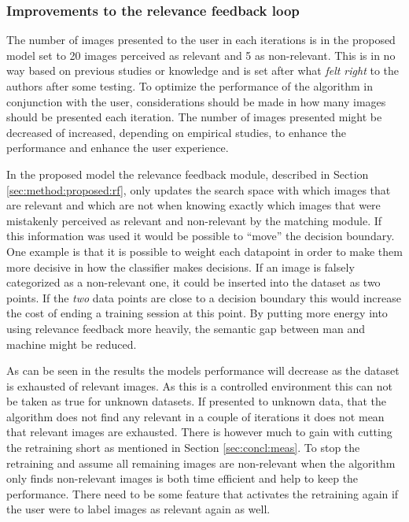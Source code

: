 \subsubsection{Improvements to the relevance feedback loop}
\label{sec:conc:future:model:rf}
The number of images presented to the user in each iterations is in the proposed model set to 20 images perceived as relevant and 5 as non-relevant. This is in no way based on previous studies or knowledge and is set after what \emph{felt right} to the authors after some testing. To optimize the performance of the algorithm in conjunction with the user, considerations should be made in how many images should be presented each iteration. The number of images presented might be decreased of increased, depending on empirical studies, to enhance the performance and enhance the user experience.

In the proposed model the relevance feedback module, described in Section \ref{sec:method:proposed:rf}, only updates the search space with which images that are relevant and which are not when knowing exactly which images that were mistakenly perceived as relevant and non-relevant by the matching module. If this information was used it would be possible to ``move'' the decision boundary. 
One example is that it is possible to weight each datapoint in order to make them more decisive in how the classifier makes decisions. If an image is falsely categorized as a non-relevant one, it could be inserted into the dataset as two points. If the \emph{two} data points are close to a decision boundary this would increase the cost of ending a training session at this point. By putting more energy into using relevance feedback more heavily, the semantic gap between man and machine might be reduced. 

As can be seen in the results the models performance will decrease as the dataset is exhausted of relevant images. As this is a controlled environment this can not be taken as true for unknown datasets. If presented to unknown data, that the algorithm does not find any relevant in a couple of iterations it does not mean that relevant images are exhausted. There is however much to gain with cutting the retraining short as mentioned in Section \ref{sec:concl:meas}. To stop the retraining and assume all remaining images are non-relevant when the algorithm only finds non-relevant images is both time efficient and help to keep the performance. There need to be some feature that activates the retraining again if the user were to label images as relevant again as well. 

